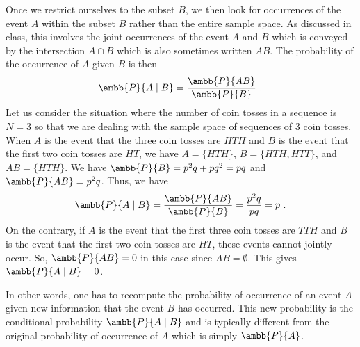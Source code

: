 \documentclass[12pt]{article} %
\newcommand{\mP}{\ambb{P}}
\begin{document}
Once we restrict ourselves to the subset $B$, we then look for
occurrences of the event $A$ within the subset $B$ rather than the
entire sample space. As discussed in class, this involves the joint
occurrences of the event $A$ and $B$ which is conveyed by the
intersection $A \cap B$ which is also sometimes written $AB$. The
probability of the occurrence of $A$ given $B$ is then
\begin{equation}
  \mP\{A \mid B\} = \frac{\mP\{AB\}}{\mP\{B\}}\ .
\end{equation}
Let us consider the situation where the number of coin tosses in a
sequence is $N=3$ so that we are dealing with the sample space of
sequences of $3$ coin tosses. When $A$ is the event that the three
coin tosses are $HTH$ and $B$ is the event that the first two coin
tosses are $HT$, we have $A = \{HTH\}$, $B = \{HTH, HTT\}$, and $AB =
\{HTH\}$. We have $\mP\{B\} = p^2 q + pq^2 = pq$ and
$\mP\{AB\} = p^2 q$. Thus, we have
\begin{equation}
  \mP\{A\mid B\} = \frac{\mP\{AB\}}{\mP\{B\}} = \frac{p^2 q}{pq} = p\ .
\end{equation}
On the contrary, if $A$ is the event that the first three coin tosses
are $TTH$ and $B$ is the event that the first two coin tosses are
$HT$, these events cannot jointly occur. So, $\mP\{AB\}=0$ in this
case since $AB = \emptyset$. This gives $\mP\{A\mid B\} = 0$.

In other words, one has to recompute the probability of occurrence of
an event $A$ given new information that the event $B$ has occurred.
This new probability is the conditional probability $\mP\{A\mid B\}$
and is typically different from the original probability of
occurrence of $A$ which is simply $\mP\{A\}$.
\end{document}
